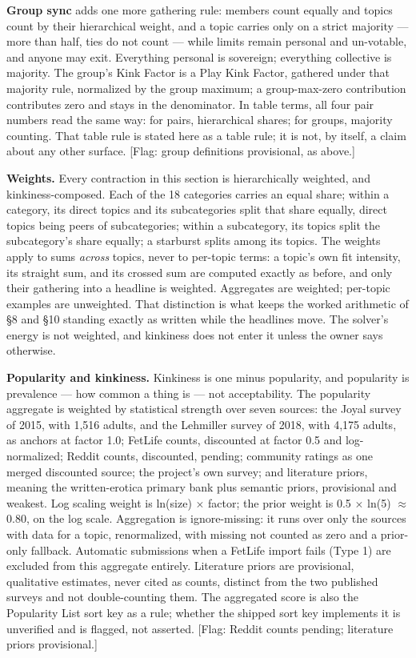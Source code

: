 \textbf{Group sync} adds one more gathering rule: members count equally
and topics count by their hierarchical weight, and a topic carries only
on a strict majority --- more than half, ties do not count --- while
limits remain personal and un-votable, and anyone may exit. Everything
personal is sovereign; everything collective is majority. The group's
Kink Factor is a Play Kink Factor, gathered under that majority rule,
normalized by the group maximum; a group-max-zero contribution
contributes zero and stays in the denominator. In table terms, all four
pair numbers read the same way: for pairs, hierarchical shares; for
groups, majority counting. That table rule is stated here as a table
rule; it is not, by itself, a claim about any other surface. {[}Flag:
group definitions provisional, as above.{]}

\textbf{Weights.} Every contraction in this section is hierarchically
weighted, and kinkiness-composed. Each of the 18 categories carries an
equal share; within a category, its direct topics and its subcategories
split that share equally, direct topics being peers of subcategories;
within a subcategory, its topics split the subcategory's share equally;
a starburst splits among its topics. The weights apply to sums
\emph{across} topics, never to per-topic terms: a topic's own fit
intensity, its straight sum, and its crossed sum are computed exactly as
before, and only their gathering into a headline is weighted. Aggregates
are weighted; per-topic examples are unweighted. That distinction is
what keeps the worked arithmetic of \S 8 and \S 10 standing exactly as
written while the headlines move. The solver's energy is not weighted,
and kinkiness does not enter it unless the owner says otherwise.

\textbf{Popularity and kinkiness.} Kinkiness is one minus popularity,
and popularity is prevalence --- how common a thing is --- not
acceptability. The popularity aggregate is weighted by statistical
strength over seven sources: the Joyal survey of 2015, with 1,516
adults, and the Lehmiller survey of 2018, with 4,175 adults, as anchors
at factor 1.0; FetLife counts, discounted at factor 0.5 and
log-normalized; Reddit counts, discounted, pending; community ratings as
one merged discounted source; the project's own survey; and literature
priors, meaning the written-erotica primary bank plus semantic priors,
provisional and weakest. Log scaling weight is ln(size) $\times$ factor; the
prior weight is 0.5 $\times$ ln(5) $\approx$ 0.80, on the log scale. Aggregation is
ignore-missing: it runs over only the sources with data for a topic,
renormalized, with missing not counted as zero and a prior-only
fallback. Automatic submissions when a FetLife import fails (Type 1) are
excluded from this aggregate entirely. Literature priors are
provisional, qualitative estimates, never cited as counts, distinct from
the two published surveys and not double-counting them. The aggregated
score is also the Popularity List sort key as a rule; whether the
shipped sort key implements it is unverified and is flagged, not
asserted. {[}Flag: Reddit counts pending; literature priors
provisional.{]}

